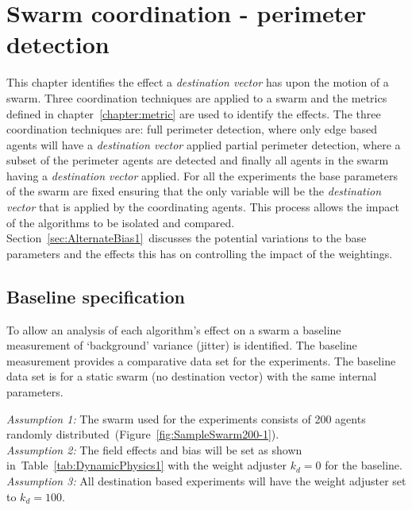\chapter{Swarm coordination - perimeter detection}\label{chapter:coordination}
This chapter identifies the effect a \textit{destination vector} has upon the motion of a swarm. Three coordination techniques are applied to a swarm and the metrics defined in chapter~\ref{chapter:metric} are used to identify the effects. The three coordination techniques are: full perimeter detection, where only edge based agents will have a \textit{destination vector} applied partial perimeter detection, where a subset of the perimeter agents are detected and finally all agents in the swarm having a \textit{destination vector} applied. For all the experiments the base parameters of the swarm are fixed ensuring that the only variable will be the \textit{destination vector} that is applied by the coordinating agents. This process allows the impact of the algorithms to be isolated and compared. Section~\ref{sec:AlternateBias1}~discusses the potential variations to the base parameters and the effects this has on controlling the impact of the weightings.

\section{Baseline specification}
To allow an analysis of each algorithm's effect on a swarm a baseline measurement of `background' variance (jitter) is identified. The baseline measurement provides a comparative data set for the experiments. The baseline data set is for a static swarm (no destination vector) with the same internal parameters.

\textit{Assumption 1:} The swarm used for the experiments consists of 200 agents randomly distributed~(Figure~\ref{fig:SampleSwarm200-1}).\\ 
\textit{Assumption 2:} The field effects and bias will be set as shown in~Table~\ref{tab:DynamicPhysics1} with the weight adjuster $k_d = 0$ for the baseline.\\
\textit{Assumption 3:} All destination based experiments will have the weight adjuster set to $k_d = 100$.

